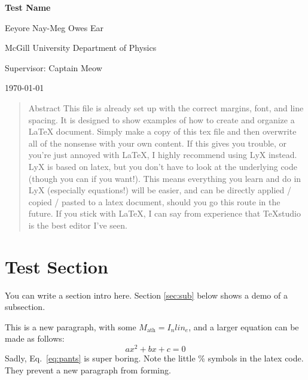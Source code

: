 \documentclass[12pt]{article}
\begin{document}
	
\begin{titlepage}
	\begin{center}
		
		\vspace*{1cm}
		
		\Huge
		\textbf{Test Name}
		\large
		\vspace{1.5cm}
		
		Eeyore Nay-Meg Owes Ear
		
		McGill University Department of Physics
		
		Supervisor: Captain Meow
		
		\today
		
	\end{center}
	
\end{titlepage}

\begin{abstract}

Abstract This file is already set up with the correct margins, font, and line spacing. It is designed to show examples of how to create and organize a LaTeX document. Simply make a copy of this tex file and then overwrite all of the nonsense with your own content. If this gives you trouble, or you're just annoyed with LaTeX, I highly recommend using LyX instead. LyX is based on latex, but you don't have to look at the underlying code (though you can if you want!). This means everything you learn and do in LyX (especially equations!) will be easier, and can be directly applied / copied / pasted to a latex document, should you go this route in the future. If you stick with LaTeX, I can say from experience that TeXstudio is the best editor I've seen.

\end{abstract}
\tableofcontents{}

\thispagestyle{empty}
\pagebreak
\setcounter{page}{1}


\section{Test Section}\label{sec:test}

You can write a section intro here. Section \ref{sec:sub} below shows a demo of a subsection.

This is a new paragraph, with some $M_\textrm{ath}=I_n lin_e$, and a larger equation can be made as follows:
%
\begin{equation}\label{eq:pants}
ax^2 + bx + c = 0
\end{equation}
%
Sadly, Eq.~\ref{eq:pants} is super boring. Note the little \% symbols in the latex code. They prevent a new paragraph from forming.
\end{document}
